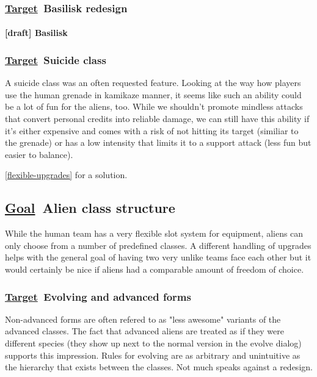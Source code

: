 \documentclass{scrartcl}
\newcommand{\goal}     [0]{\textbf{\underline{Goal}\ }}
\newcommand{\target}   [0]{\textbf{\underline{Target}\ }}
\newcommand{\draft}    [0]{\textcolor{draft}    {\textbf{[draft] }}}
\begin{document}
\subsubsection{\target Basilisk redesign}

\paragraph{\draft Basilisk}
\label{paralisk}

\subsubsection{\target Suicide class}
\label{suicide-class}

A suicide class was an often requested feature. Looking at the way how players use the human grenade in kamikaze manner, it seems like such an ability could be a lot of fun for the aliens, too. While we shouldn't promote mindless attacks that convert personal credits into reliable damage, we can still have this ability if it's either expensive and comes with a risk of not hitting its target (similiar to the grenade) or has a low intensity that limits it to a support attack (less fun but easier to balance).

\ref{flexible-upgrades} for a solution.

\subsection{\goal Alien class structure}

While the human team has a very flexible slot system for equipment, aliens can only choose from a number of predefined classes. A different handling of upgrades helps with the general goal of having two very unlike teams face each other but it would certainly be nice if aliens had a comparable amount of freedom of choice.

\subsubsection{\target Evolving and advanced forms}

Non-advanced forms are often refered to as "less awesome" variants of the advanced classes. The fact that advanced aliens are treated as if they were different species (they show up next to the normal version in the evolve dialog) supports this impression. Rules for evolving are as arbitrary and unintuitive as the hierarchy that exists between the classes. Not much speaks against a redesign.
\end{document}
